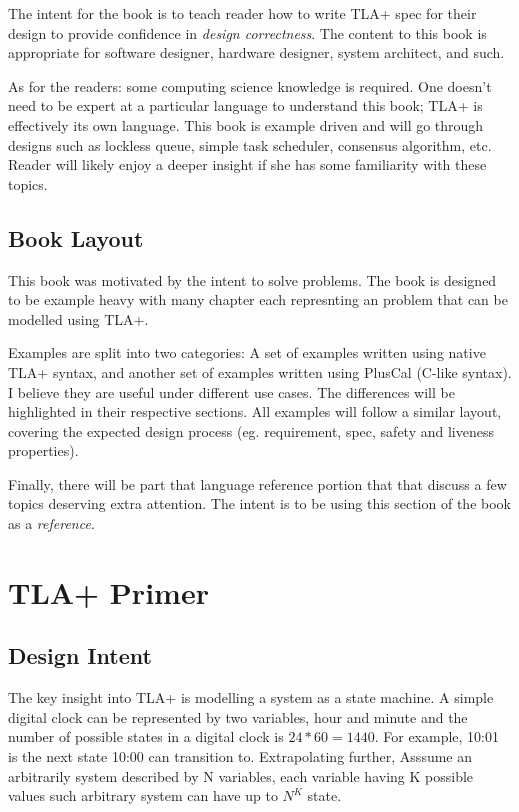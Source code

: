 \documentclass{report}
\begin{document}
The intent for the book is to teach reader how to write TLA+ spec for their
design to provide confidence in \textit{design correctness}. The content to this
book is appropriate for software designer, hardware designer, system architect,
and such.\newline 

As for the readers: some computing science knowledge is required. One doesn't
need to be expert at a particular language to understand this book; TLA+ is
effectively its own language. This book is example driven and will go through
designs such as lockless queue, simple task scheduler, consensus algorithm, etc.
Reader will likely enjoy a deeper insight if she has some familiarity with these
topics.

\section{Book Layout}

This book was motivated by the intent to solve problems. The book is designed to
be example heavy with many chapter each represnting an problem that can be
modelled using TLA+.\newline

Examples are split into two categories: A set of examples written using native
TLA+ syntax, and another set of examples written using PlusCal (C-like syntax).
I believe they are useful under different use cases. The differences will be
highlighted in their respective sections. All examples will follow a similar 
layout, covering the expected design process (eg. requirement, spec, safety and
liveness properties). \newline

Finally, there will be part that language reference portion that that discuss a
few topics deserving extra attention. The intent is to be using this section of the 
book as a \textit{reference}.

\chapter{TLA+ Primer}

\section{Design Intent}

The key insight into TLA+ is modelling a system as a state machine. A simple
digital clock can be represented by two variables, hour and minute and the
number of possible states in a digital clock is $24 * 60 = 1440$.  For example,
10:01 is the next state 10:00 can transition to. Extrapolating further, Asssume
an arbitrarily system described by N variables, each variable having K possible
values such arbitrary system can have up to $N^K$ state.\newline
\end{document}
